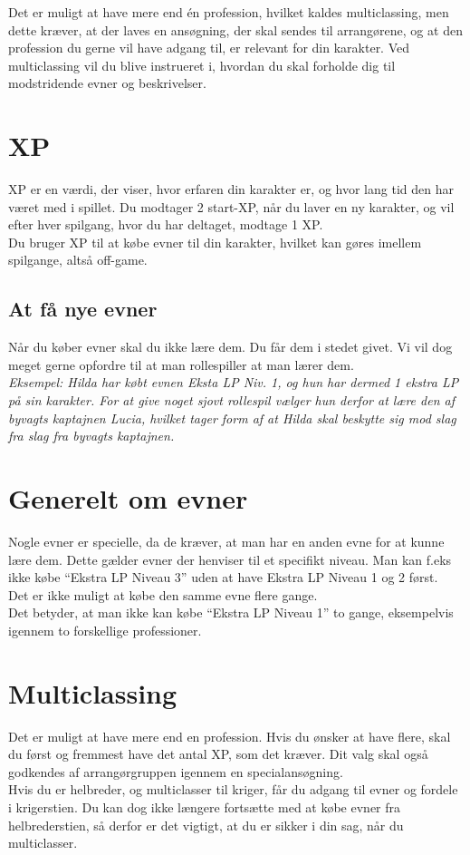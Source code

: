 Det er muligt at have mere end én profession, hvilket kaldes multiclassing, men dette kræver, at der laves en ansøgning, der skal sendes til arrangørene, og at den profession du gerne vil have adgang til, er relevant for din karakter.
Ved multiclassing vil du blive instrueret i, hvordan du skal forholde dig til modstridende evner og beskrivelser.


\section*{XP}
XP er en værdi, der viser, hvor erfaren din karakter er, og hvor lang tid den har været med i spillet. Du modtager 2 start-XP, når du laver en ny karakter, og vil efter hver spilgang, hvor du har deltaget, modtage 1 XP.\\ 
Du bruger XP til at købe evner til din karakter, hvilket kan gøres imellem spilgange, altså off-game.

\subsection*{At få nye evner}
Når du køber evner skal du ikke lære dem. Du får dem i stedet givet. Vi vil dog meget gerne opfordre til at man rollespiller at man lærer dem.\\
\textit{Eksempel: Hilda har købt evnen Eksta LP Niv. 1, og hun har dermed 1 ekstra LP på sin karakter. For at give noget sjovt rollespil vælger hun derfor at lære den af byvagts kaptajnen Lucia, hvilket tager form af at Hilda skal beskytte sig mod slag fra slag fra byvagts kaptajnen.}\\

\section*{Generelt om evner}
Nogle evner er specielle, da de kræver, at man har en anden evne for at kunne lære dem. Dette gælder evner der henviser til et specifikt niveau. Man kan f.eks ikke købe “Ekstra LP Niveau 3” uden at have Ekstra LP Niveau 1 og 2 først.\\
Det er ikke muligt at købe den samme evne flere gange.\\
Det betyder, at man ikke kan købe “Ekstra LP Niveau 1” to gange, eksempelvis igennem to forskellige professioner.

\section*{Multiclassing}
Det er muligt at have mere end en profession. Hvis du ønsker at have flere, skal du først og fremmest have det antal XP, som det kræver. Dit valg skal også godkendes af arrangørgruppen igennem en specialansøgning.\\
Hvis du er helbreder, og multiclasser til kriger, får du adgang til evner og fordele i krigerstien. Du kan dog ikke længere fortsætte med at købe evner fra helbrederstien, så derfor er det vigtigt, at du er sikker i din sag, når du multiclasser.

